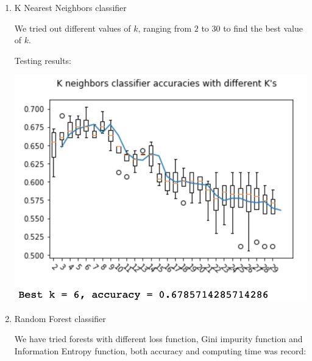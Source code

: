 \documentclass[11.5pt]{article}
\begin{document}
\begin{enumerate}
\begin{itemize}
\begin{enumerate}
                \item K Nearest Neighbors classifier

                We tried out different values of $k$, ranging from $2$ to $30$ to find the best value of $k$.

                Testing results:
                
                \includegraphics[width=0.75\linewidth]{images/knn_k.png}

                \item Random Forest classifier

                We have tried forests with different loss function, Gini impurity function and Information Entropy function, both accuracy and computing time was record:


\end{enumerate}
\end{itemize}
\end{enumerate}
\end{document}
